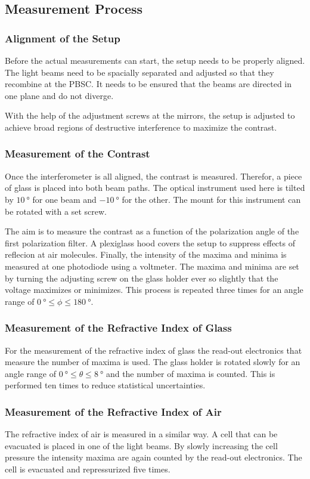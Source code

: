 \subsection{Measurement Process}
\label{sec:Measurement_process}
\subsubsection{Alignment of the Setup}
Before the actual measurements can start, the setup needs to be properly aligned. The light beams need to be spacially separated and adjusted so that they recombine
at the PBSC. It needs to be ensured that the beams are directed in one plane and do not diverge.

With the help of the adjustment screws at the mirrors, the setup is adjusted to achieve broad regions of destructive interference to maximize the contrast.

\subsubsection{Measurement of the Contrast}
\label{sec:Measure_contrast}
Once the interferometer is all aligned, the contrast is measured. Therefor, a piece of glass is placed into both beam paths. The optical instrument used here is tilted
by $\qty{+10}{\degree}$ for one beam and $\qty{-10}{\degree}$ for the other. The mount for this instrument can be rotated with a set screw.

The aim is to measure the contrast as a function of the polarization angle of the first polarization filter. A plexiglass hood covers the setup to suppress effects of
reflecion at air molecules. Finally, the intensity of the maxima and minima is measured at one photodiode using a voltmeter. The maxima and minima are set by turning the adjusting 
screw on the glass holder ever so slightly that the voltage maximizes or minimizes. This process is repeated three times for an angle range of $\qty{0}{\degree}≤\phi≤\qty{180}{\degree}$.

\subsubsection{Measurement of the Refractive Index of Glass}
\label{sec:Measure_n_Glass}
For the measurement of the refractive index of glass the read-out electronics that measure the number of maxima is used. The glass holder is rotated slowly for an
angle range of $\qty{0}{\degree}≤\theta≤\qty{8}{\degree}$ and the number of maxima is counted. This is performed ten times to reduce statistical uncertainties.

\subsubsection{Measurement of the Refractive Index of Air}
\label{sec:Measure_n_Air}
The refractive index of air is measured in a similar way. A cell that can be evacuated is placed in one of the light beams. By slowly increasing the cell pressure
the intensity maxima are again counted by the read-out electronics. The cell is evacuated and repressurized five times.